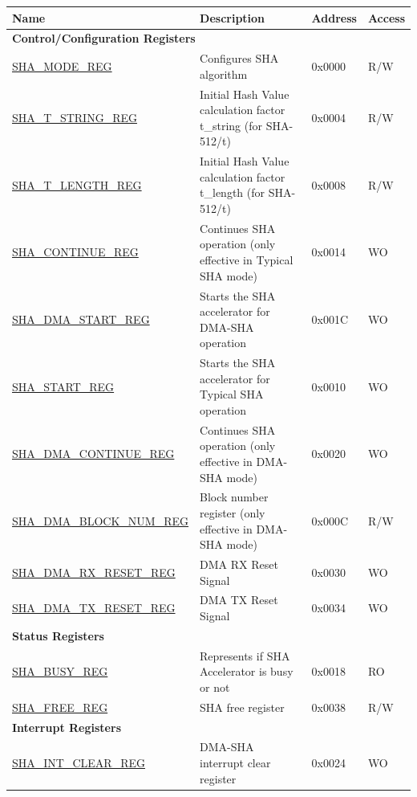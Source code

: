 \begin{longtable}{ | l | l | l |l | }
\hline\rowcolor{lightgray}
\textbf{Name} & \textbf{Description} &  \textbf{Address} & \textbf{Access} \\ \hline
\endhead
\multicolumn{4}{|l|}{\textbf{Control/Configuration Registers}} \\ \hline
\hyperref[regdesc:SHAMODEREG]{SHA\_MODE\_REG} & Configures SHA algorithm & 0x0000 & R/W \\ \hline
\hyperref[regdesc:SHATSTRINGREG]{SHA\_T\_STRING\_REG} & Initial Hash Value calculation factor t\_string (for SHA-512/t) & 0x0004 & R/W \\ \hline
\hyperref[regdesc:SHATLENGTHREG]{SHA\_T\_LENGTH\_REG} & Initial Hash Value calculation factor t\_length (for SHA-512/t) & 0x0008 & R/W \\ \hline
\hyperref[regdesc:SHACONTINUEREG]{SHA\_CONTINUE\_REG} & Continues SHA operation (only effective in Typical SHA mode) & 0x0014 & WO \\ \hline
\hyperref[regdesc:SHADMASTARTREG]{SHA\_DMA\_START\_REG} & Starts the SHA accelerator for DMA-SHA operation & 0x001C & WO \\ \hline
\hyperref[regdesc:SHASTARTREG]{SHA\_START\_REG} & Starts the SHA accelerator for Typical SHA operation & 0x0010 & WO \\ \hline
\hyperref[regdesc:SHADMACONTINUEREG]{SHA\_DMA\_CONTINUE\_REG} & Continues SHA operation (only effective in DMA-SHA mode) & 0x0020 & WO \\ \hline
\hyperref[regdesc:SHADMABLOCKNUMREG]{SHA\_DMA\_BLOCK\_NUM\_REG} & Block number register (only effective in DMA-SHA mode) & 0x000C & R/W \\ \hline
\hyperref[regdesc:SHADMARXRESETREG]{SHA\_DMA\_RX\_RESET\_REG} & DMA RX Reset Signal & 0x0030 & WO \\ \hline
\hyperref[regdesc:SHADMATXRESETREG]{SHA\_DMA\_TX\_RESET\_REG} & DMA TX Reset Signal & 0x0034 & WO \\ \hline
\multicolumn{4}{|l|}{\textbf{Status Registers}} \\ \hline
\hyperref[regdesc:SHABUSYREG]{SHA\_BUSY\_REG} & Represents if SHA Accelerator is busy or not & 0x0018 & RO \\ \hline
\hyperref[regdesc:SHAFREEREG]{SHA\_FREE\_REG} & SHA free register & 0x0038 & R/W \\ \hline
\multicolumn{4}{|l|}{\textbf{Interrupt Registers}} \\ \hline
\hyperref[regdesc:SHAINTCLEARREG]{SHA\_INT\_CLEAR\_REG} & DMA-SHA interrupt clear register & 0x0024 & WO \\ \hline

\end{longtable}
